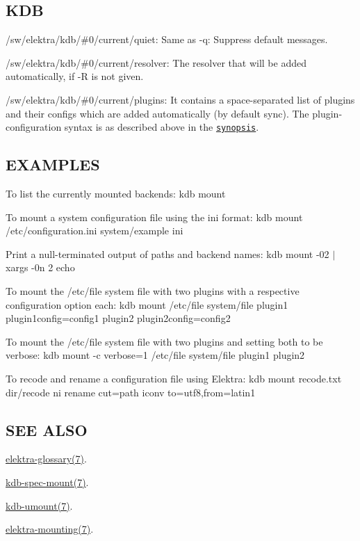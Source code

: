 \subsection*{K\+DB}


\begin{DoxyItemize}
\item {\ttfamily /sw/elektra/kdb/\#0/current/quiet}\+: Same as {\ttfamily -\/q}\+: Suppress default messages.
\item {\ttfamily /sw/elektra/kdb/\#0/current/resolver}\+: The resolver that will be added automatically, if {\ttfamily -\/R} is not given.
\item {\ttfamily /sw/elektra/kdb/\#0/current/plugins}\+: It contains a space-\/separated list of plugins and their configs which are added automatically (by default sync). The plugin-\/configuration syntax is as described above in the \href{#SYNOPSIS}{\tt synopsis}.
\end{DoxyItemize}

\subsection*{E\+X\+A\+M\+P\+L\+ES}

To list the currently mounted backends\+: {\ttfamily kdb mount}

To mount a system configuration file using the ini format\+: {\ttfamily kdb mount /etc/configuration.ini system/example ini}

Print a null-\/terminated output of paths and backend names\+: {\ttfamily kdb mount -\/02 $\vert$ xargs -\/0n 2 echo}

To mount the /etc/file system file with two plugins with a respective configuration option each\+: {\ttfamily kdb mount /etc/file system/file plugin1 plugin1config=config1 plugin2 plugin2config=config2}

To mount the /etc/file system file with two plugins and setting both to be verbose\+: {\ttfamily kdb mount -\/c verbose=1 /etc/file system/file plugin1 plugin2}

To recode and rename a configuration file using Elektra\+: {\ttfamily kdb mount recode.\+txt dir/recode ni rename cut=path iconv to=utf8,from=latin1}

\subsection*{S\+EE A\+L\+SO}


\begin{DoxyItemize}
\item \hyperlink{md_doc_help_elektra-glossary_doc_help_elektra-glossary_md}{elektra-\/glossary(7)}.
\item \hyperlink{md_doc_help_kdb-spec-mount_doc_help_kdb-spec-mount_md}{kdb-\/spec-\/mount(7)}.
\item \hyperlink{md_doc_help_kdb-umount_doc_help_kdb-umount_md}{kdb-\/umount(7)}.
\item \hyperlink{md_doc_help_elektra-mounting_doc_help_elektra-mounting_md}{elektra-\/mounting(7)}. 
\end{DoxyItemize}